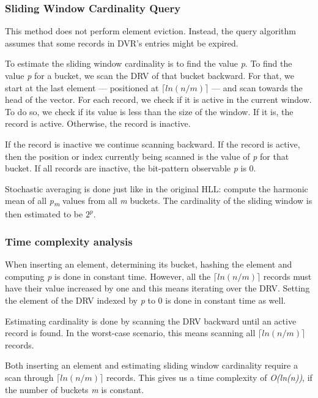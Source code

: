 \subsubsection*{Sliding Window Cardinality Query} 
This method does not perform element eviction. Instead, the query algorithm assumes that some records in DVR's entries might be expired. 

To estimate the sliding window cardinality is to find the value \textit{p}. To find the value \textit{p} for a bucket, we scan the DRV of that bucket backward. For that, we start at the last element --- positioned at \textit{$\lceil ln(n/m) \rceil$} --- and scan towards the head of the vector. For each record, we check if it is active in the current window. To do so, we check if its value is less than the size of the window. If it is, the record is active. Otherwise, the record is inactive.

If the record is inactive we continue scanning backward. If the record is active, then the position or index currently being scanned is the value of \textit{p} for that bucket. If all records are inactive, the bit-pattern observable \textit{p} is 0.

Stochastic averaging is done just like in the original HLL: compute the harmonic mean of all \textit{p\textsubscript{m}} values from all \textit{m} buckets. The cardinality of the sliding window is then estimated to be $2^\textit{p}$.

\subsubsection*{Time complexity analysis}
When inserting an element, determining its bucket, hashing the element and computing \textit{p} is done in constant time. However, all the  \textit{$\lceil ln(n/m) \rceil$} records must have their value increased by one and this means iterating over the DRV. Setting the element of the DRV indexed by \textit{p} to 0 is done in constant time as well. 

Estimating cardinality is done by scanning the DRV backward until an active record is found. In the worst-case scenario, this means scanning all \textit{$\lceil ln(n/m) \rceil$} records.

Both inserting an element and estimating sliding window cardinality require a scan through \textit{$\lceil ln(n/m) \rceil$} records. This gives us a time complexity of \textit{O(\textit{ln(n)})}, if the number of buckets \textit{m} is constant. 

